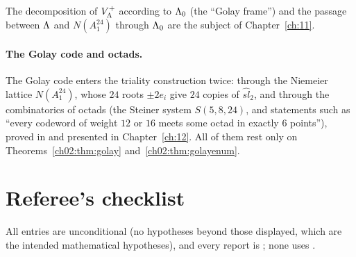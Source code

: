 The decomposition of $V_{\Lambda}^+$ according to ${\Lambda}_0$ (the ``Golay frame'') and the passage
between ${\Lambda}$ and $N(A_1^{24})$ through ${\Lambda}_0$ are the subject of Chapter~\ref{ch:11}.

\paragraph{The Golay code and octads.}  The Golay code enters the triality construction twice:
through the Niemeier lattice $N(A_1^{24})$, whose $24$ roots $\pm2e_i$ give $24$ copies of
$\widehat{sl}_2$, and through the combinatorics of octads (the Steiner system $S(5,8,24)$, and
statements such as ``every codeword of weight $12$ or $16$ meets some octad in exactly $6$
points''), proved in  and presented in
Chapter~\ref{ch:12}.  All of them rest only on Theorems~\ref{ch02:thm:golay}
and~\ref{ch02:thm:golayenum}.

\section{Referee's checklist}\label{ch02:sec:checklist}

All entries are unconditional (no hypotheses beyond those displayed, which are the intended
mathematical hypotheses), and every  report is ; none uses .

